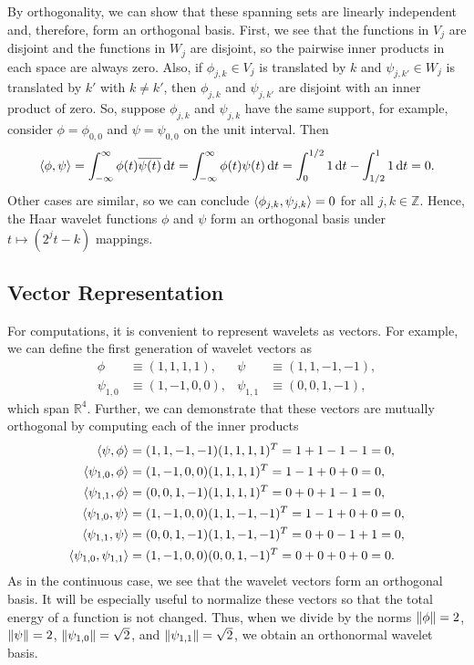 \documentclass[12pt]{article}
\DeclarePairedDelimiter{\iprod}{\langle}{\rangle}
\def\ZZ{\mathbb{Z}}
\theoremstyle{definition}
\begin{document}
  By orthogonality, we can show that these spanning sets are linearly independent and, therefore, form an orthogonal basis. First, we see that the functions in \(V_j\) are disjoint and the functions in \(W_j\) are disjoint, so the pairwise inner products in each space are always zero. Also, if \(\phi_{j,k} \in V_j\) is translated by \(k\) and \(\psi_{j,k'} \in W_j\) is translated by \(k'\) with \(k \neq k'\), then \(\phi_{j,k}\) and \(\psi_{j,k'}\) are disjoint with an inner product of zero. So, suppose \(\phi_{j,k}\) and \(\psi_{j,k}\) have the same support, for example, consider \(\phi = \phi_{0,0}\) and \(\psi = \psi_{0,0}\) on the unit interval. Then
  \begin{equation*} \label{eqn:orthogonality-of-haar}
    \iprod{\phi,\psi}
      = \int_{-\infty}^\infty \phi(t) \overline{\psi(t)} \dd{t}
      = \int_{-\infty}^\infty \phi(t) \psi(t) \dd{t}
      = \int_{0}^{1/2}1 \dd{t} - \int_{1/2}^{1}1 \dd{t}
      = 0.
  \end{equation*}
  Other cases are similar, so we can conclude \(\iprod{\phi_{j,k},\psi_{j,k}} = 0\) for all \(j,k \in \ZZ\). Hence, the Haar wavelet functions \(\phi\) and \(\psi\) form an orthogonal basis under \(t \mapsto (2^jt-k)\) mappings.
  
  \subsection{Vector Representation}
  
  For computations, it is convenient to represent wavelets as vectors. For example, we can define the first generation of wavelet vectors as
  \begin{align*}
    \phi &\equiv (1,1,1,1), &
    \psi &\equiv (1,1,-1,-1), \\
    \psi_{1,0} &\equiv (1,-1,0,0), &
    \psi_{1,1} &\equiv (0,0,1,-1),
  \end{align*}
  which span \(\mathbb{R}^4\). Further, we can demonstrate that these vectors are mutually orthogonal by computing each of the inner products
  \begin{align*}
    \iprod{\psi, \phi} &=
    (1,1,-1,-1) (1,1,1,1)^T = 1+1-1-1 = 0, \\
    \iprod{\psi_{1,0}, \phi} &=
    (1,-1,0,0) (1,1,1,1)^T = 1-1+0+0 = 0, \\
    \iprod{\psi_{1,1}, \phi} &=
    (0,0,1,-1) (1,1,1,1)^T = 0+0+1-1 = 0, \\
    \iprod{\psi_{1,0}, \psi} &=
    (1,-1,0,0) (1,1,-1,-1)^T = 1-1+0+0 = 0, \\
    \iprod{\psi_{1,1}, \psi} &=
    (0,0,1,-1) (1,1,-1,-1)^T = 0+0-1+1 = 0, \\
    \iprod{\psi_{1,0}, \psi_{1,1}} &=
    (1,-1,0,0) (0,0,1,-1)^T = 0+0+0+0 = 0.
  \end{align*}
  As in the continuous case, we see that the wavelet vectors form an orthogonal basis. It will be especially useful to normalize these vectors so that the total energy of a function is not changed. Thus, when we divide by the norms \(\norm{\phi} = 2\), \(\norm{\psi} = 2\), \(\norm{\psi_{1,0}} = \sqrt{2}\), and \(\norm{\psi_{1,1}} = \sqrt{2}\), we obtain an orthonormal wavelet basis.
  
\end{document}
